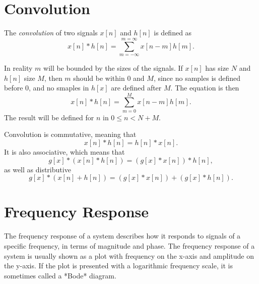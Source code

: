 \documentclass[openany]{book}
\def\lsqb{\left[}
\def\rsqb{\right]}
\def\sqb#1{\lsqb #1 \rsqb}
\def\xsig{x\sqb{n}}
\begin{document}
\section{Convolution}
The \textit{convolution} of two signals $\xsig$ and $h\sqb{n}$ is defined as
\begin{equation}
    \xsig * h\sqb{n} = \sum_{m = -\infty}^{m = \infty} x\sqb{n - m}h\sqb{m}.
\end{equation}

In reality $m$ will be bounded by the sizes of the signals. If $\xsig$ has size $N$ and $h\sqb{n}$ size $M$, then $m$ should be within $0$ and $M$, since no samples is defined before $0$, and no smaples in $h\sqb{x}$ are defined after $M$. The equation is then
\begin{equation}
    \xsig * h\sqb{n} = \sum_{m = 0}^{M} x\sqb{n - m}h\sqb{m}.
\end{equation}
The result will be defined for $n$ in $0 \leq n < N + M$.

Convolution is commutative, meaning that
\begin{equation}
    \xsig * h\sqb{n} = h\sqb{n} * \xsig.
\end{equation}
It is also associative, which means that
\begin{equation}
    g\sqb{x} * (\xsig * h\sqb{n}) = (g\sqb{x} * \xsig) * h\sqb{n},
\end{equation}
as well as distributive
\begin{equation}
    g\sqb{x} * (\xsig + h\sqb{n}) = (g\sqb{x} * \xsig) + (g\sqb{x} *  h\sqb{n}).
\end{equation}

\section{Frequency Response}
The frequency response of a system describes how it responds to signals of a specific frequency, in terms of magnitude and phase. The frequency response of a system is usually shown as a plot with frequency on the x-axis and amplitude on the y-axis. If the plot is presented with a logarithmic frequency scale, it is sometimes called a *Bode* diagram.


\printindex
\end{document}
